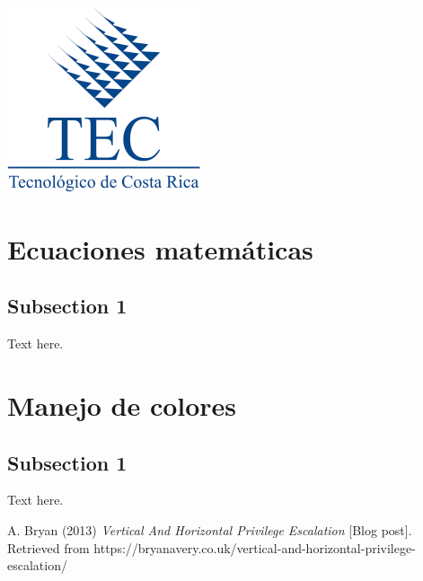 \documentclass[letterpaper, 10pt, journal]{IEEEtran}
\begin{document}
\begin{minipage}[t]{0.15\textwidth}
\includegraphics[width=\textwidth]{tec-logo}
\end{minipage}

\section{Ecuaciones matem\'aticas}
\subsection{Subsection 1}
Text here.

\section{Manejo de colores}
\subsection{Subsection 1}
Text here.

\begin{thebibliography}{1}
A. Bryan  (2013) \emph{Vertical And Horizontal Privilege Escalation} [Blog post]. Retrieved from https://bryanavery.co.uk/vertical-and-horizontal-privilege-escalation/



\end{thebibliography}
\end{document}
